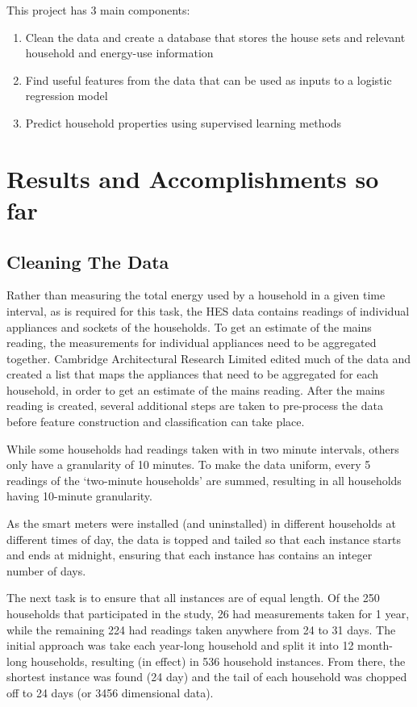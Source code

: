 \documentclass[12pt,a4paper]{article}
\begin{document}
This project has 3 main components:

\begin{enumerate}
\item Clean the data and create a database that stores the house sets and relevant household and energy-use information
\item Find useful features from the data that can be used as inputs to a logistic regression model 
\item Predict household properties using supervised learning methods
\end{enumerate}

\section*{Results and Accomplishments so far}
\subsection*{Cleaning The Data}
Rather than measuring the total energy used by a household in a given time interval, as is required for this task, the HES data contains readings of individual appliances and sockets of the households. To get an estimate of the mains reading, the measurements for individual appliances need to be aggregated together. Cambridge Architectural Research Limited edited much of the data and created a list that maps  the appliances that need to be aggregated for each household, in order to get an estimate of the mains reading. After the mains reading is created, several additional steps are taken to pre-process the data before feature construction and classification can take place.

While some households had readings taken with in two minute intervals, others only have a granularity of 10 minutes. To make the data uniform, every 5 readings of the `two-minute households' are summed, resulting in all households having 10-minute granularity. 

As the smart meters were installed (and uninstalled) in different households at different times of day, the data is topped and tailed so that each instance starts and ends at midnight, ensuring that each instance has contains an integer number of days.

The next task is to ensure that all instances are of equal length. Of the 250 households that participated in the study, 26 had measurements taken for 1 year, while the remaining 224 had readings taken anywhere from 24 to 31 days. The initial approach was take each year-long household and split it into 12 month-long households, resulting (in effect) in 536 household instances.  From there, the shortest instance was found (24 day) and the tail of each household was chopped off to 24 days (or 3456 dimensional data). 
\end{document}
